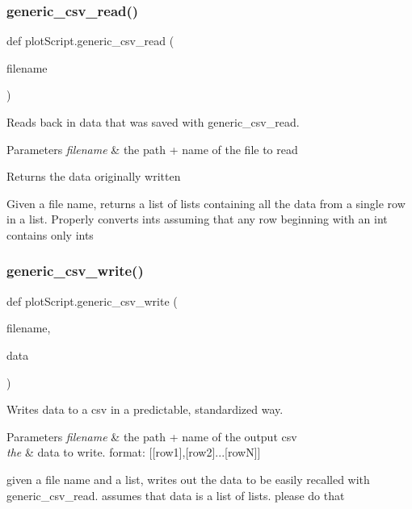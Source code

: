 \subsubsection{\texorpdfstring{generic\_csv\_read()}{generic\_csv\_read()}}
{\footnotesize\ttfamily def plot\+Script.\+generic\+\_\+csv\+\_\+read (\begin{DoxyParamCaption}\item[{}]{filename }\end{DoxyParamCaption})}



Reads back in data that was saved with generic\+\_\+csv\+\_\+read. 


\begin{DoxyParams}{Parameters}
{\em filename} & the path + name of the file to read \\
\hline
\end{DoxyParams}
\begin{DoxyReturn}{Returns}
the data originally written \begin{DoxyVerb}Given a file name, returns a list of lists containing all the data from a
single row in a list. Properly converts ints assuming that any row beginning
with an int contains only ints
\end{DoxyVerb}
 
\end{DoxyReturn}
\mbox{\label{namespaceplot_script_a053d63ca6e9ca1102330536298125fea}} 
\subsubsection{\texorpdfstring{generic\_csv\_write()}{generic\_csv\_write()}}
{\footnotesize\ttfamily def plot\+Script.\+generic\+\_\+csv\+\_\+write (\begin{DoxyParamCaption}\item[{}]{filename,  }\item[{}]{data }\end{DoxyParamCaption})}



Writes data to a csv in a predictable, standardized way. 


\begin{DoxyParams}{Parameters}
{\em filename} & the path + name of the output csv \\
\hline
{\em the} & data to write. format\+: \mbox{[}\mbox{[}row1\mbox{]},\mbox{[}row2\mbox{]}...\mbox{[}rowN\mbox{]}\mbox{]} \begin{DoxyVerb}given a file name and a list, writes out the data to be easily recalled with
generic_csv_read. assumes that data is a list of lists. please do that
\end{DoxyVerb}
 \\
\hline
\end{DoxyParams}
\mbox{\label{namespaceplot_script_a5e18b3c4830942374d0c449071412c1b}} 

